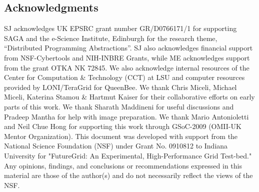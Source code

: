 \documentclass[3p,twocolumn]{elsarticle}
\begin{document}








\subsection*{Acknowledgments}

\small{SJ acknowledges UK EPSRC grant number GR/D0766171/1 for
  supporting SAGA and the e-Science Institute, Edinburgh for the
  research theme, ``Distributed Programming Abstractions''.  SJ also
  acknowledges financial support from NSF-Cybertools and NIH-INBRE
  Grants, while ME acknowledges support from the grant OTKA NK 72845.
  We also acknowledge internal resources of the Center for Computation
  \& Technology (CCT) at LSU and computer resources provided by
  LONI/TeraGrid for QueenBee.  We thank Chris Miceli, Michael Miceli,
  Katerina Stamou \& Hartmut Kaiser for their collaborative efforts on
  early parts of this work. We thank Sharath Maddineni for useful
  discussions and Pradeep Mantha for help with image preparation. We
  thank Mario Antonioletti and Neil Chue Hong for supporting this work
  through GSoC-2009 (OMII-UK Mentor Organization). This document was
  developed with support from the National Science Foundation (NSF)
  under Grant No. 0910812 to Indiana University for "FutureGrid: An
  Experimental, High-Performance Grid Test-bed." Any opinions,
  findings, and conclusions or recommendations expressed in this
  material are those of the author(s) and do not necessarily reflect
  the views of the NSF.}



\end{document}
